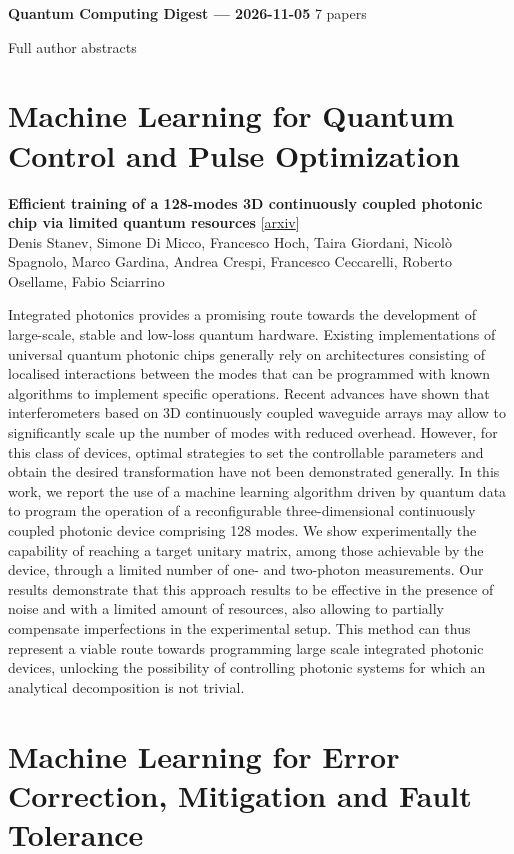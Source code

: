\documentclass[12pt,letterpaper]{article}
\begin{document}
{\footnotesize\textbf{Quantum Computing Digest --- 2026-11-05} \hfill 7 papers}

{\scriptsize Full author abstracts}

\section*{Machine Learning for Quantum Control and Pulse Optimization}

{\small\textbf{Efficient training of a 128-modes 3D continuously coupled photonic chip via limited quantum resources}} {\scriptsize[\href{https://arxiv.org/abs/2611.05681}{arxiv}]}\nopagebreak\\
{\scriptsize Denis Stanev, Simone Di Micco, Francesco Hoch, Taira Giordani, Nicol\`o Spagnolo, Marco Gardina, Andrea Crespi, Francesco Ceccarelli, Roberto Osellame, Fabio Sciarrino}\nopagebreak\\[2pt]
{\footnotesize Integrated photonics provides a promising route towards the development of large-scale, stable and low-loss quantum hardware. Existing implementations of universal quantum photonic chips generally rely on architectures consisting of localised interactions between the modes that can be programmed with known algorithms to implement specific operations. Recent advances have shown that interferometers based on 3D continuously coupled waveguide arrays may allow to significantly scale up the number of modes with reduced overhead. However, for this class of devices, optimal strategies to set the controllable parameters and obtain the desired transformation have not been demonstrated generally. In this work, we report the use of a machine learning algorithm driven by quantum data to program the operation of a reconfigurable three-dimensional continuously coupled photonic device comprising 128 modes. We show experimentally the capability of reaching a target unitary matrix, among those achievable by the device, through a limited number of one- and two-photon measurements. Our results demonstrate that this approach results to be effective in the presence of noise and with a limited amount of resources, also allowing to partially compensate imperfections in the experimental setup. This method can thus represent a viable route towards programming large scale integrated photonic devices, unlocking the possibility of controlling photonic systems for which an analytical decomposition is not trivial.\par}
\medskip


\section*{Machine Learning for Error Correction, Mitigation and Fault Tolerance}
\end{document}
